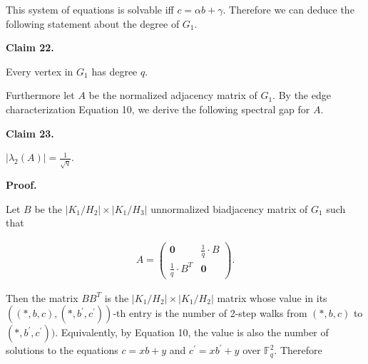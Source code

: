 This system of equations is solvable iff $c=\alpha b+\gamma$. Therefore we can deduce the following statement about the degree of $G_{1}$.\par





\par\medskip\noindent\textbf{
Claim 22. 
}\par



Every vertex in $G_{1}$ has degree $q$.\par






Furthermore let $A$ be the normalized adjacency matrix of $G_{1}$. By the edge characterization Equation 10, we derive the following spectral gap for $A$.\par





\par\medskip\noindent\textbf{
Claim 23. 
}\par



$|\lambda_{2}(A)|=\frac{1}{\sqrt{q}}$.\par






\par\medskip\noindent\textbf{
\textbf{Proof}.}\par




Let $B$ be the $|K_{1}/H_{2}|\times|K_{1}/H_{3}|$ unnormalized biadjacency matrix of $G_{1}$ such that\par


\[\begin{gathered}
A=\begin{pmatrix}\mathbf{0}&\frac{1}{q}\cdot B\\
\frac{1}{q}\cdot B^{T}&\mathbf{0}\end{pmatrix}.
\end{gathered}\]




Then the matrix $BB^{T}$ is the $|K_{1}/H_{2}|\times|K_{1}/H_{2}|$ matrix whose value in its $((*,b,c),(*,b^{\prime},c^{\prime}))$-th entry is the number of 2-step walks from $(*,b,c)$ to $(*,b^{\prime},c^{\prime}))$. Equivalently, by Equation 10, the value is also the number of solutions to the equations $c=xb+y$ and $c^{\prime}=xb^{\prime}+y$ over $\mathbb{F}^{2}_{q}$. Therefore\par


